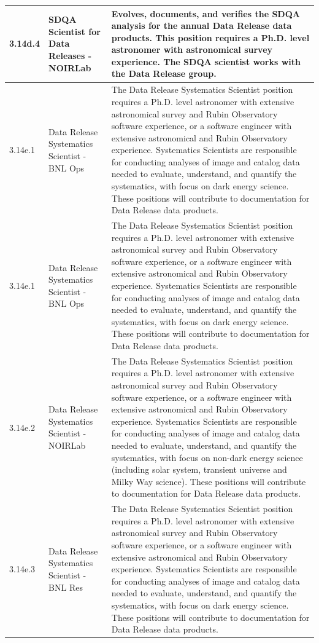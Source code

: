 \begin{longtable} {|p{}|p{}|p{}|}
{3.14d.4}&{SDQA Scientist for Data Releases - NOIRLab}&{Evolves, documents, and verifies the SDQA analysis for the annual Data Release data products. This position requires a Ph.D. level astronomer with astronomical survey experience. The SDQA scientist works with the Data Release group.} \\ \hline
{3.14e.1}&{Data Release Systematics Scientist - BNL Ops}&{The Data Release Systematics Scientist position requires a Ph.D. level astronomer with extensive astronomical survey and Rubin Observatory software experience, or a software engineer with extensive astronomical and Rubin Observatory experience. Systematics Scientists are responsible for conducting analyses of image and catalog data needed to evaluate, understand, and quantify the systematics, with focus on dark energy science. These positions will contribute to documentation for Data Release data products. } \\ \hline
{3.14e.1}&{Data Release Systematics Scientist - BNL Ops}&{The Data Release Systematics Scientist position requires a Ph.D. level astronomer with extensive astronomical survey and Rubin Observatory software experience, or a software engineer with extensive astronomical and Rubin Observatory experience. Systematics Scientists are responsible for conducting analyses of image and catalog data needed to evaluate, understand, and quantify the systematics, with focus on dark energy science. These positions will contribute to documentation for Data Release data products. } \\ \hline
{3.14e.2}&{Data Release Systematics Scientist - NOIRLab}&{The Data Release Systematics Scientist position requires a Ph.D. level astronomer with extensive astronomical survey and Rubin Observatory software experience, or a software engineer with extensive astronomical and Rubin Observatory experience. Systematics Scientists are responsible for conducting analyses of image and catalog data needed to evaluate, understand, and quantify the systematics, with focus on non-dark energy science (including solar system, transient universe and Milky Way science). These positions will contribute to documentation for Data Release data products.} \\ \hline
{3.14e.3}&{Data Release Systematics Scientist - BNL Res}&{The Data Release Systematics Scientist position requires a Ph.D. level astronomer with extensive astronomical survey and Rubin Observatory software experience, or a software engineer with extensive astronomical and Rubin Observatory experience. Systematics Scientists are responsible for conducting analyses of image and catalog data needed to evaluate, understand, and quantify the systematics, with focus on dark energy science. These positions will contribute to documentation for Data Release data products. } \\ \hline

\end{longtable}
